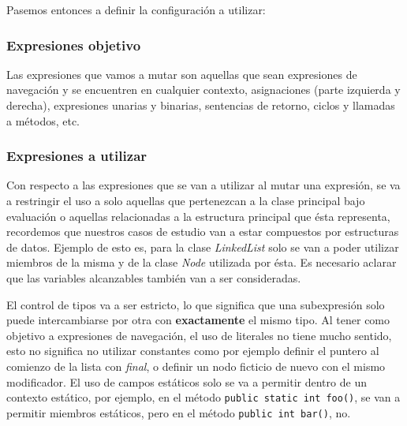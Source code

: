 Pasemos entonces a definir la configuraci\'on a utilizar:

\subsubsection{Expresiones objetivo}

Las expresiones que vamos a mutar son aquellas que sean expresiones de navegaci\'on y se encuentren en cualquier contexto, asignaciones (parte izquierda y derecha), expresiones unarias y binarias, sentencias de retorno, ciclos y llamadas a m\'etodos, etc.

\subsubsection{Expresiones a utilizar}

Con respecto a las expresiones que se van a utilizar al mutar una expresi\'on, se va a restringir el uso a solo aquellas que pertenezcan a la clase principal bajo evaluaci\'on o aquellas relacionadas a la estructura principal que \'esta representa, recordemos que nuestros casos de estudio van a estar compuestos por estructuras de datos. Ejemplo de esto es, para la clase \emph{LinkedList} solo se van a poder utilizar miembros de la misma y de la clase \emph{Node} utilizada por \'esta. Es necesario aclarar que las variables alcanzables tambi\'en van a ser consideradas.

El control de tipos va a ser estricto, lo que significa que una subexpresi\'on solo puede intercambiarse por otra con \textbf{exactamente} el mismo tipo. Al tener como objetivo a expresiones de navegaci\'on, el uso de literales no tiene mucho sentido, esto no significa no utilizar constantes como por ejemplo definir el puntero al comienzo de la lista con \emph{final}, o definir un nodo ficticio de nuevo con el mismo modificador. El uso de campos est\'aticos solo se va a permitir dentro de un contexto est\'atico, por ejemplo, en el m\'etodo \lstinline|public static int foo()|, se van a permitir miembros est\'aticos, pero en el m\'etodo \lstinline|public int bar()|, no.

